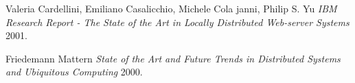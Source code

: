 

\begin{thebibliography}{1}

 Valeria Cardellini, Emiliano Casalicchio, Michele Cola janni, Philip S. Yu {\em IBM Research Report - The State of the Art in Locally Distributed Web-server Systems}  2001.

 Friedemann Mattern  {\em State of the Art and Future Trends in Distributed Systems and Ubiquitous Computing} 2000.


\end{thebibliography}